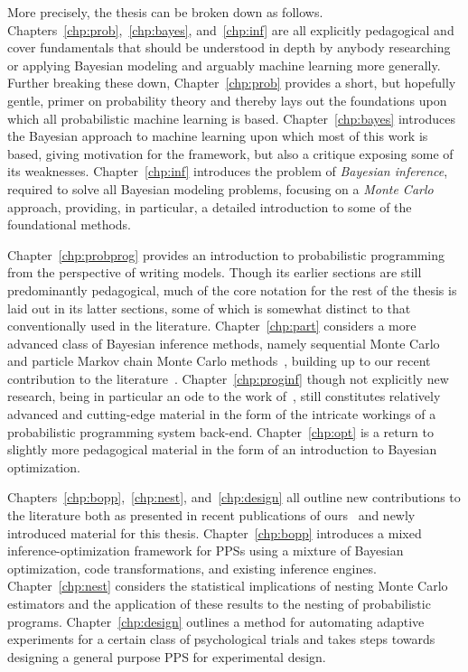 More precisely, the thesis can be broken down as follows.
Chapters~\ref{chp:prob},~\ref{chp:bayes}, and~\ref{chp:inf} are all explicitly pedagogical
and cover fundamentals that should be understood in depth by anybody researching or
applying Bayesian modeling and arguably machine learning more generally.  Further breaking these down,
Chapter~\ref{chp:prob} provides a short, but hopefully gentle, primer on probability theory and
thereby lays out the foundations upon which all probabilistic machine learning is based.
Chapter~\ref{chp:bayes} introduces the Bayesian approach to machine learning upon which most of
this work is based, giving motivation for the framework, but also a critique exposing some of its weaknesses. 
Chapter~\ref{chp:inf} introduces the problem of \emph{Bayesian inference}, required to solve all Bayesian
modeling problems, focusing on a \emph{Monte Carlo} approach, providing, in particular, a detailed
introduction to some of the foundational methods.

Chapter~\ref{chp:probprog} provides an introduction to
probabilistic programming from the perspective of writing models.  Though its earlier
sections are still predominantly pedagogical,
much of the core notation for the rest of the thesis is laid out in its latter sections, some of
which is somewhat distinct to that conventionally used in the literature.
Chapter~\ref{chp:part} considers a more advanced class of Bayesian inference methods,
namely sequential Monte Carlo~\citep{doucet2009tutorial} and particle Markov chain Monte
Carlo methods~\citep{andrieu2010particle},
building up to our recent contribution to the literature~\citep{rainforth2016interacting}.
Chapter~\ref{chp:proginf} though not explicitly new research, being in particular an ode
to the work of~\cite{tolpin2016design}, still constitutes
relatively advanced and cutting-edge material in the form of the intricate workings
of a probabilistic programming system back-end.   Chapter~\ref{chp:opt} is a return
to slightly more pedagogical material in the form of an introduction to Bayesian optimization.

Chapters~\ref{chp:bopp},~\ref{chp:nest}, and~\ref{chp:design} all outline new
contributions to the literature both as presented in recent publications of
ours~\citep{rainforth2016bayesian,rainforth2017pitfalls,rainforth2017nestpp,
	vincent2017darc} and newly introduced
material for this thesis.  Chapter~\ref{chp:bopp} introduces a mixed 
inference-optimization framework for PPSs using a mixture of Bayesian optimization,
code transformations, and existing inference engines.  Chapter~\ref{chp:nest}
considers the statistical implications of nesting Monte Carlo estimators and the
application of these results to the nesting of probabilistic
programs.  Chapter~\ref{chp:design} outlines a method for automating adaptive experiments
for a certain class of psychological trials and takes steps towards designing a general
purpose PPS for experimental design.